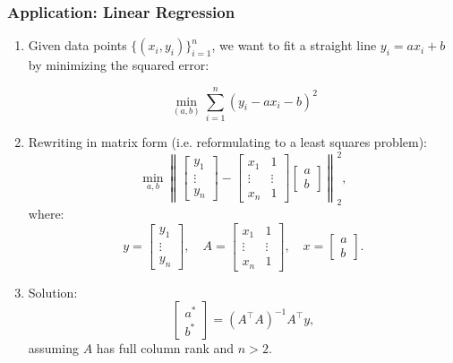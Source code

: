 \subsubsection{Application: Linear Regression}
\begin{example}
    \begin{enumerate}
        \item Given data points \( \{(x_i, y_i)\}_{i=1}^n \), we want to fit a straight line \( y_i = ax_i + b \) by minimizing the squared error:

        \[
        \min_{(a, b)} \sum_{i=1}^n (y_i - ax_i - b)^2
        \]

    
        \item Rewriting in matrix form (i.e. reformulating to a least squares problem):
        \[
        \min_{a, b} \left\| 
        \begin{bmatrix}
        y_1 \\ 
        \vdots \\ 
        y_n
        \end{bmatrix}
        - 
        \begin{bmatrix}
        x_1 & 1 \\ 
        \vdots & \vdots \\ 
        x_n & 1
        \end{bmatrix}
        \begin{bmatrix}
        a \\ 
        b
        \end{bmatrix}
        \right\|_2^2,
        \]
        where:
        \[
        y = \begin{bmatrix}
        y_1 \\ 
        \vdots \\ 
        y_n
        \end{bmatrix}, \quad
        A = \begin{bmatrix}
        x_1 & 1 \\ 
        \vdots & \vdots \\ 
        x_n & 1
        \end{bmatrix}, \quad
        x = \begin{bmatrix}
        a \\ 
        b
        \end{bmatrix}.
        \]
    
        \item Solution:
        \[
        \begin{bmatrix}
        a^* \\ 
        b^*
        \end{bmatrix}
        = (A^\top A)^{-1} A^\top y,
        \]
        assuming \( A \) has full column rank and $n > 2$. 
    

\end{enumerate}
\end{example}
